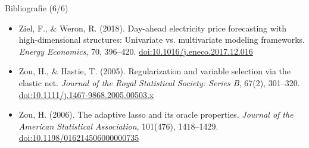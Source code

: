 \begin{frame}{Bibliografie (6/6)}
\begin{itemize}
    \item Ziel, F., \& Weron, R. (2018). Day-ahead electricity price forecasting with high-dimensional structures: Univariate vs. multivariate modeling frameworks. \textit{Energy Economics}, 70, 396--420. \href{https://doi.org/10.1016/j.eneco.2017.12.016}{doi:10.1016/j.eneco.2017.12.016}
    \item Zou, H., \& Hastie, T. (2005). Regularization and variable selection via the elastic net. \textit{Journal of the Royal Statistical Society: Series B}, 67(2), 301--320. \href{https://doi.org/10.1111/j.1467-9868.2005.00503.x}{doi:10.1111/j.1467-9868.2005.00503.x}
    \item Zou, H. (2006). The adaptive lasso and its oracle properties. \textit{Journal of the American Statistical Association}, 101(476), 1418--1429. \href{https://doi.org/10.1198/016214506000000735}{doi:10.1198/016214506000000735}
\end{itemize}
\end{frame}


